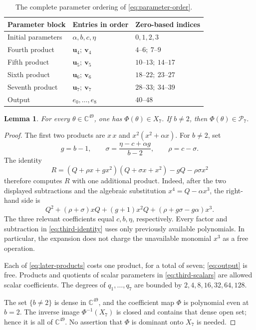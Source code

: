 \documentclass[11pt]{article}
\newtheorem{lemma}[theorem]{Lemma}
\newcommand{\C}{\mathbb C}
\begin{document}
\begin{table}[htbp]
\centering
\begin{tabular}{@{}lll@{}}
\toprule
Parameter block & Entries in order & Zero-based indices\\
\midrule
Initial parameters & $\alpha,b,c,\eta$ & $0,1,2,3$\\
Fourth product & $\mathbf u_4;\ \mathbf v_4$ & $4$--$6;\ 7$--$9$\\
Fifth product & $\mathbf u_5;\ \mathbf v_5$ & $10$--$13;\ 14$--$17$\\
Sixth product & $\mathbf u_6;\ \mathbf v_6$ & $18$--$22;\ 23$--$27$\\
Seventh product & $\mathbf u_7;\ \mathbf v_7$ & $28$--$33;\ 34$--$39$\\
Output & $e_0,\ldots,e_8$ & $40$--$48$\\
\bottomrule
\end{tabular}
\caption{The complete parameter ordering of \eqref{eq:parameter-order}.}
\label{tab:parameters}
\end{table}

\begin{lemma}\label{lem:membership}
For every $\theta\in\C^{49}$, one has $\Phi(\theta)\in X_7$.
If $b\ne2$, then $\Phi(\theta)\in\mathcal P_7$.
\end{lemma}

\begin{proof}
The first two products are $x\,x$ and $x^2(x^2+\alpha x)$.
For $b\ne2$, set
\begin{equation}\label{eq:third-scalars}
 g=b-1,\qquad
 \sigma=\frac{\eta-c+\alpha g}{b-2},\qquad
 \rho=c-\sigma.
\end{equation}
The identity
\begin{equation}\label{eq:third-identity}
 R=(Q+\rho x+g x^2)(Q+\sigma x+x^2)-gQ-\rho\sigma x^2
\end{equation}
therefore computes $R$ with one additional product. Indeed, after the
two displayed subtractions and the algebraic substitution
$x^4=Q-\alpha x^3$, the right-hand side is
\[
 Q^2+(\rho+\sigma)xQ+(g+1)x^2Q
       +(\rho+g\sigma-g\alpha)x^3.
\]
The three relevant coefficients equal $c,b,\eta$, respectively.
Every factor and subtraction in \eqref{eq:third-identity} uses only
previously available polynomials. In particular, the expansion does not
charge the unavailable monomial $x^3$ as a free operation.

Each of \eqref{eq:later-products} costs one product, for a total of seven;
\eqref{eq:output} is free. Products and quotients of scalar parameters
in \eqref{eq:third-scalars} are allowed scalar coefficients. The degrees
of $q_1,\ldots,q_7$ are bounded by $2,4,8,16,32,64,128$.

The set $\{b\ne2\}$ is dense in $\C^{49}$, and the coefficient map
$\Phi$ is polynomial even at $b=2$. The inverse image $\Phi^{-1}(X_7)$
is closed and contains that dense open set; hence it is all of
$\C^{49}$. No assertion that $\Phi$ is dominant onto $X_7$ is needed.
\end{proof}
\end{document}
